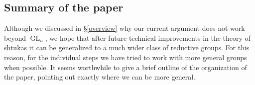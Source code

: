 \documentclass[reqno]{amsart}
\numberwithin{equation}{section}
\DeclareMathOperator{\GL}{GL}
\theoremstyle{remark}
\numberwithin{equation}{section}
\begin{document}






\subsection{Summary of the paper}

Although we discussed in \S \ref{overview} why our current argument does not work beyond $\GL_n$, we hope that after future technical improvements in the theory of shtukas it can be generalized to a much wider class of reductive groups. For this reason, for the individual steps we have tried to work with more general groups when possible. It seems worthwhile to give a brief outline of the organization of the paper, pointing out exactly where we can be more general. 
\end{document}
